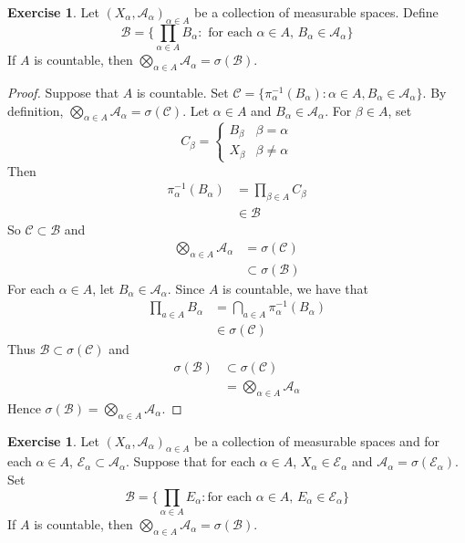 \documentclass{book}
\theoremstyle{definition}
\newtheorem{ex}[definition]{Exercise}
\newcommand{\al}{\alpha}
\newcommand{\be}{\beta}
\newcommand{\sig}{\sigma}
\newcommand{\MA}{\mathcal{A}}
\newcommand{\MB}{\mathcal{B}}
\newcommand{\MC}{\mathcal{C}}
\newcommand{\ME}{\mathcal{E}}
\newcommand{\lex}[1]{\label{ex:#1}}
\DeclareMathOperator*{\0}{\mbf{0}}
\DeclareMathOperator*{\1}{\mbf{1}}
\begin{document}
 	\begin{ex} \lex{25003}
 		Let $(X_{\al}, \MA_{\al})_{\al \in A}$ be a collection of measurable spaces. Define $$\MB = \bigg \{\prod_{\al \in A}B_{\al}: \text{ for each $\al \in A$, } B_{\al} \in \MA_{\al} \bigg\}$$
 		If $A$ is countable, then $\bigotimes\limits_{\al \in A} \MA_{\al} = \sig(\MB)$. 
 	\end{ex}
 	
 	\begin{proof}
 		Suppose that $A$ is countable. Set $\MC = \{\pi_{\al}^{-1}(B_{\al}): \al \in A, B_{\al} \in \MA_{\al}\}$. By definition, $\bigotimes\limits_{\al \in A} \MA_{\al} = \sig(\MC)$. Let $\al \in A$ and $B_{\al} \in \MA_{\al}$. For $\be \in A$, set 
 		\[
 		C_{\be} = 
 		\begin{cases}
 			B_{\be} & \be = \al \\
 			X_{\be} & \be \neq \al
 		\end{cases}
 		\]
 		Then 
 		\begin{align*}
 			\pi_{\al}^{-1}(B_{\al}) 
 			& = \prod_{\be \in A} C_{\be} \\
 			& \in \MB
 		\end{align*}
 		So $\MC \subset \MB$ and 
 		\begin{align*}
 			\bigotimes\limits_{\al \in A} \MA_{\al}
 			& = \sig(\MC) \\
 			& \subset \sig(\MB)
 		\end{align*}
 		For each $\al \in A$, let $B_{\al} \in \MA_{\al}$. Since $A$ is countable, we have that 
 		\begin{align*}
 			\prod_{a \in A} B_{\al} 
 			& = \bigcap_{a \in A} \pi_{\al}^{-1}(B_{\al}) \\
 			& \in \sig(\MC) 
 		\end{align*}
 		Thus $\MB \subset \sig(\MC)$ and 
 		\begin{align*}
 			\sig(\MB) 
 			& \subset \sig(\MC) \\
 			& = \bigotimes\limits_{\al \in A} \MA_{\al}
 		\end{align*}
 		Hence $\sig(\MB) = \bigotimes\limits_{\al \in A} \MA_{\al}$. 
 	\end{proof}
 
 	\begin{ex} \lex{25004}
 		Let $(X_{\al}, \MA_{\al})_{\al \in A}$ be a collection of measurable spaces and for each $\al \in A$, $\ME_{\al} \subset \MA_{\al}$. Suppose that for each $\al \in A$, $X_{\al} \in \ME_{\al}$ and $\MA_{\al} = \sig(\ME_{\al})$. Set 
 		$$\MB = \bigg \{ \prod\limits_{\al \in A} E_{\al}:  \text{for each $\al \in A$, } E_{\al} \in \ME_{\al} \bigg \}$$ 
 		If $A$ is countable, then $\bigotimes\limits_{\al \in A} \MA_{\al} = \sig(\MB)$.
 	\end{ex}
 
\end{document}
